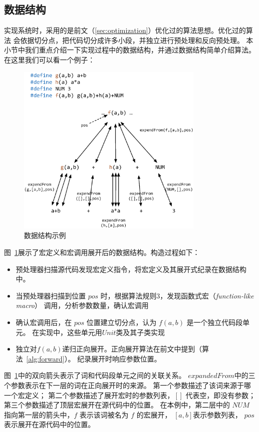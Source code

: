 \subsection{数据结构}\label{sec:datastruct}
实现系统时，采用的是前文（\ref{sec:optimization}）优化过的算法思想。优化过的算法
会依据切分点，把代码切分成许多小段，并独立进行预处理和反向预处理。
本小节中我们重点介绍一下实现过程中的数据结构，并通过数据结构简单介绍算法。
在这里我们可以看一个例子：
\begin{figure}
\centering
\includegraphics[width=9cm]{pics/original.eps}
\caption{数据结构示例 \label{pic:datastruct}}
\end{figure}

图~\ref{pic:datastruct}展示了宏定义和宏调用展开后的数据结构。构造过程如下：
\begin{itemize}
\item 预处理器扫描源代码发现宏定义指令，将宏定义及其展开式纪录在数据结构中。
\item 当预处理器扫描到位置 $pos$ 时，根据算法规则3，发现函数式宏（\emph{function-like macro}）
  调用，分析参数数量，确认宏调用
\item 确认宏调用后，在 $pos$ 位置建立切分点，认为 $f(a, b)$ 是一个独立代码段单元。
  在实现中，这些单元用$Unit$类及其子类实现
\item 独立对$f(a, b)$递归正向展开。正向展开算法在前文中提到（算法~\ref{alg:forward}）。
  纪录展开时响应参数位置。
\end{itemize}

图~\ref{pic:datastruct}中的双向箭头表示了词和代码段单元之间的关联关系。
$expandedFrom$中的三个参数表示在下一层的词在正向展开时的来源。
第一个参数描述了该词来源于哪一个宏定义；
第二个参数描述了展开宏时的参数列表，$[]$ 代表空，即没有参数；
第三个参数描述了顶层宏展开在源代码中的位置。
在本例中，第二层中的 $NUM$ 指向第一层的箭头中，$f$ 表示该词被名为 $f$ 的宏展开，
$[a, b]$表示参数列表， $pos$表示展开在源代码中的位置。

